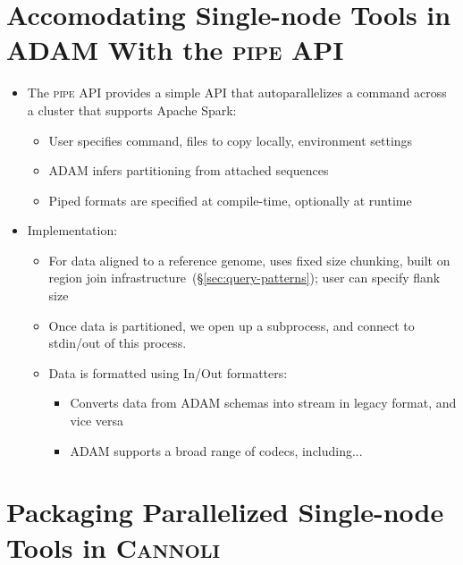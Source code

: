 \documentclass[phd]{ucbthesis}
\begin{document}
\section{Accomodating Single-node Tools in \textsc{ADAM} With the \textsc{pipe} API}
\label{sec:pipe-api}

\begin{itemize}
\item The \textsc{pipe} API provides a simple API that autoparallelizes a command
  across a cluster that supports Apache Spark:
  \begin{itemize}
  \item User specifies command, files to copy locally, environment settings
  \item ADAM infers partitioning from attached sequences
  \item Piped formats are specified at compile-time, optionally at runtime
  \end{itemize}
\item Implementation:
  \begin{itemize}
  \item For data aligned to a reference genome, uses fixed size chunking, built on
    region join infrastructure~(\S\ref{sec:query-patterns}); user can specify flank size
  \item Once data is partitioned, we open up a subprocess, and connect to stdin/out of
    this process.
  \item Data is formatted using In/Out formatters:
    \begin{itemize}
    \item Converts data from ADAM schemas into stream in legacy format, and vice versa
    \item \textsc{ADAM} supports a broad range of codecs, including...
    \end{itemize}
  \end{itemize}
\end{itemize}

\section{Packaging Parallelized Single-node Tools in \textsc{Cannoli}}
\label{sec:parallelizing-in-cannoli}
\end{document}
